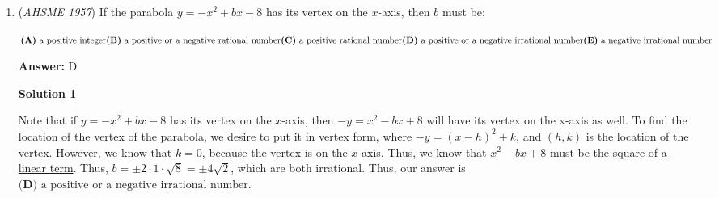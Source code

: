 \begin{enumerate}
Let $t$ be the time it takes (in hours) for the men to meet. Then, the distance the first man will have travelled is $4t$. If $t$ is an integer, the second man will have travelled $\frac{2+2+0.5(t-1)}{2} \cdot t$, the sum of the first $t$ terms of the \href{https://artofproblemsolving.com/wiki/index.php?title=Arithmetic\_progression}{arithmetic progression}. If $t$ is not an integer, then we should have a good enough approximation to choose an answer choice (given the relatively large distance of $72$ miles compared to their speeds). Because the combined distance that the men travel must be $72$ miles, we can now solve for $t$ in the following formula:\begin{align*}4t+\frac{2+2+0.5(t-1)}{2} \cdot t &= 72 \\4t+\frac{4+0.5t-0.5}{2} \cdot t &= 72 \\8t+3.5t+0.5t^2 &= 144 \\t^2+23t &= 288 \\t^2+23t-288 &= 0 \\(t+32)(t-9) &= 0\end{align*}
Because $t>0$, we are left with $t=9$. At $t=9$, the first man will have travelled $36$ miles, which is half of te distance between $M$ and $N$. Thus, our answer is $\boxed{\textbf{(E)} \text{ midway between } M \text{ and } N}$.

 


	\item (\textit{AHSME 1957}) If the parabola $y = -x^2 + bx - 8$ has its vertex on the $x$-axis, then $b$ must be: 


 $\textbf{(A)}\ \text{a positive integer}\qquad \\  \textbf{(B)}\ \text{a positive or a negative rational number}\qquad \\  \textbf{(C)}\ \text{a positive rational number}\qquad\\  \textbf{(D)}\ \text{a positive or a negative irrational number}\qquad\\  \textbf{(E)}\ \text{a negative irrational number}$

 \textbf{Answer: }D



\textbf{Solution 1}

Note that if $y=-x^2+bx-8$ has its vertex on the $x$-axis, then $-y=x^2-bx+8$ will have its vertex on the x-axis as well. To find the location of the vertex of the parabola, we desire to put it in vertex form, where $-y=(x-h)^2+k$, and $(h,k)$ is the location of the vertex. However, we know that $k=0$, because the vertex is on the $x$-axis. Thus, we know that $x^2-bx+8$ must be the \href{https://artofproblemsolving.com/wiki/index.php?title=Perfect\_square\#Perfect\_Square\_Trinomials}{square of a linear term}. Thus, $b=\pm 2 \cdot 1 \cdot \sqrt8 =\pm 4\sqrt2$, which are both irrational. Thus, our answer is $\boxed{\textbf{(D)}\text{ a positive or a negative irrational number}}$.


\end{enumerate}
